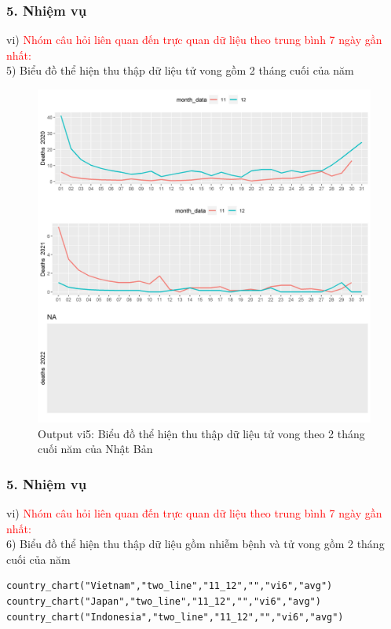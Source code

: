 \documentclass[english,10pt,table]{beamer}
\begin{document}
\begin{frame}[fragile]
\frametitle{5.  Nhiệm vụ}
vi) \textcolor{red}{Nhóm câu hỏi liên quan đến trực quan dữ liệu theo trung bình 7 ngày gần nhất:}\\
     5) Biểu đồ thể hiện thu thập dữ liệu tử vong gồm 2 tháng cuối của năm
	\begin{figure}[h!]
	\begin{center}
		    \includegraphics[scale = 0.26]{Images/VI/vi5 Japan .jpeg}
		     \caption{Output vi5: Biểu đồ thể hiện thu thập dữ liệu tử vong theo 2 tháng cuối năm của Nhật Bản}
		\end{center}
		\end{figure}
\end{frame}

\begin{frame}[fragile]
\frametitle{5.  Nhiệm vụ}
vi) \textcolor{red}{Nhóm câu hỏi liên quan đến trực quan dữ liệu theo trung bình 7 ngày gần nhất:}\\
    6) Biểu đồ thể hiện thu thập dữ liệu gồm nhiễm bệnh và tử vong gồm 2 tháng cuối của năm
   \begin{lstlisting}[frame=single,basicstyle=\tiny]  
country_chart("Vietnam","two_line","11_12","","vi6","avg")
country_chart("Japan","two_line","11_12","","vi6","avg")
country_chart("Indonesia","two_line","11_12","","vi6","avg")
		\end{lstlisting}
\end{frame}
\end{document}
